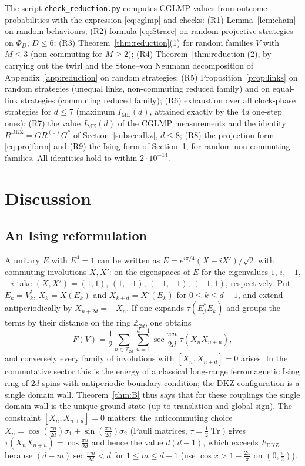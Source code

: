 \documentclass[11pt]{amsart}
\theoremstyle{definition}
\theoremstyle{remark}
\newcommand{\Z}{\mathbb{Z}}
\newcommand{\Tr}{\operatorname{Tr}}
\newcommand{\FD}{F_{\mathrm{DKZ}}}
\newcommand{\IME}{I_{\mathrm{ME}}}
\begin{document}
The script \texttt{check\_reduction.py} computes CGLMP values from outcome probabilities with the expression
\eqref{eq:cglmp} and checks: (R1) Lemma~\ref{lem:chain} on random behaviours; (R2) formula \eqref{eq:Strace} on
random projective strategies on $\Phi_D$, $D\le6$; (R3) Theorem~\ref{thm:reduction}(1) for random families $V$ with
$M\le3$ (non-commuting for $M\ge2$); (R4) Theorem~\ref{thm:reduction}(2), by carrying out the twirl and the Stone--von Neumann
decomposition of Appendix~\ref{app:reduction} on random strategies; (R5) Proposition~\ref{prop:links} on random
strategies (unequal links, non-commuting reduced family) and on equal-link strategies (commuting reduced family);
(R6) exhaustion over all clock-phase strategies for $d\le7$ (maximum $\IME(d)$, attained exactly by the $4d$
one-step ones); (R7) the value $\IME(d)$ of the CGLMP measurements and the identity $R^{\mathrm{DKZ}}=GR^{(0)}G^*$ of
Section~\ref{subsec:dkz}, $d\le8$; (R8) the projection form \eqref{eq:projform} and (R9) the Ising form of
Section~\ref{sec:discussion}, for random non-commuting families. All identities hold to within $2\cdot10^{-14}$.

\section{Discussion}\label{sec:discussion}

\subsection{An Ising reformulation}
A unitary $E$ with $E^4=1$ can be written as $E=e^{i\pi/4}(X-iX')/\sqrt2$ with commuting involutions $X,X'$: on
the eigenspaces of $E$ for the eigenvalues $1$, $i$, $-1$, $-i$ take $(X,X')=(1,1)$, $(1,-1)$, $(-1,-1)$, $(-1,1)$,
respectively. Put $E_k=V_k^*$,
$X_k=X(E_k)$ and $X_{k+d}=X'(E_k)$ for $0\le k\le d-1$, and extend antiperiodically by $X_{n+2d}=-X_n$. If one
expands $\tau(E_j^*E_k)$ and groups the terms by their distance on the ring $\Z_{2d}$, one obtains
\[
F(V)=\frac12\sum_{n\in\Z_{2d}}\sum_{u=1}^{d-1}\sec\frac{\pi u}{2d}\;\tau(X_nX_{n+u}),
\]
and conversely every family of involutions with $[X_n,X_{n+d}]=0$ arises. In the commutative sector this is the
energy of a classical long-range ferromagnetic Ising ring of $2d$ spins with antiperiodic boundary condition;
the DKZ configuration is a single domain wall. Theorem~\ref{thm:B} thus says that for these couplings the
single domain wall is the unique ground state (up to translation and global sign). The constraint
$[X_n,X_{n+d}]=0$ matters: the anticommuting choice $X_n=\cos(\frac{\pi n}{2d})\sigma_1+\sin(\frac{\pi n}{2d})\sigma_2$
(Pauli matrices, $\tau=\frac12\Tr$) gives $\tau(X_nX_{n+u})=\cos\frac{\pi u}{2d}$ and hence the value $d(d-1)$, which
exceeds $\FD$ because $(d-m)\sec\frac{\pi m}{2d}<d$ for $1\le m\le d-1$ (use $\cos x>1-\frac{2x}\pi$ on $(0,\frac\pi2)$).
\end{document}
